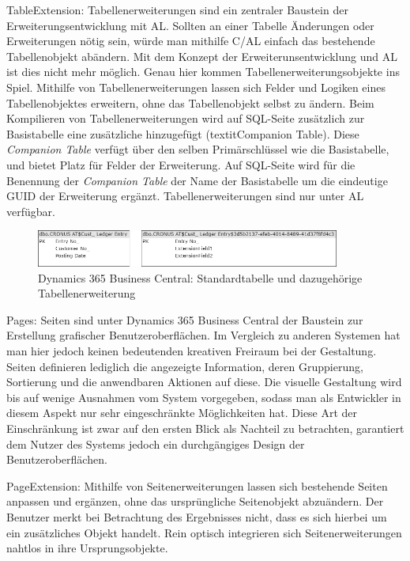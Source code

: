 TableExtension: Tabellenerweiterungen sind ein zentraler Baustein der Erweiterungsentwicklung mit AL. Sollten an einer Tabelle Änderungen oder Erweiterungen nötig sein, würde man mithilfe C/AL einfach das bestehende Tabellenobjekt abändern. Mit dem Konzept der Erweiterunsentwicklung und AL ist dies nicht mehr möglich. Genau hier kommen Tabellenerweiterungsobjekte ins Spiel. Mithilfe von Tabellenerweiterungen lassen sich Felder und Logiken eines Tabellenobjektes erweitern, ohne das Tabellenobjekt selbst zu ändern. Beim Kompilieren von Tabellenerweiterungen wird auf SQL-Seite zusätzlich zur Basistabelle eine zusätzliche hinzugefügt (textit{Companion Table}). Diese \textit{Companion Table} verfügt über den selben Primärschlüssel wie die Basistabelle, und bietet Platz für Felder der Erweiterung. Auf SQL-Seite wird für die Benennung der \textit{Companion Table} der Name der Basistabelle um die eindeutige GUID der Erweiterung ergänzt. Tabellenerweiterungen sind nur unter AL verfügbar.
\begin{figure}[h]
	\centering
	\includegraphics[width=100mm]{images/TableExtenison}
	\caption{Dynamics 365 Business Central: Standardtabelle und dazugehörige Tabellenerweiterung}
	\label{fig:TableExtension}
\end{figure}

Pages: Seiten sind unter Dynamics 365 Business Central der Baustein zur Erstellung grafischer Benutzeroberflächen. Im Vergleich zu anderen Systemen hat man hier jedoch keinen bedeutenden kreativen Freiraum bei der Gestaltung. Seiten definieren lediglich die angezeigte Information, deren Gruppierung, Sortierung und die anwendbaren Aktionen auf diese. Die visuelle Gestaltung wird bis auf wenige Ausnahmen vom System vorgegeben, sodass man als Entwickler in diesem Aspekt nur sehr eingeschränkte Möglichkeiten hat. Diese Art der Einschränkung ist zwar auf den ersten Blick als Nachteil zu betrachten, garantiert dem Nutzer des Systems jedoch ein durchgängiges Design der Benutzeroberflächen.
\linebreak

PageExtension: Mithilfe von Seitenerweiterungen lassen sich bestehende Seiten anpassen und ergänzen, ohne das ursprüngliche Seitenobjekt abzuändern. Der Benutzer merkt bei Betrachtung des Ergebnisses nicht, dass es sich hierbei um ein zusätzliches Objekt handelt. Rein optisch integrieren sich Seitenerweiterungen nahtlos in ihre Ursprungsobjekte.
\linebreak

